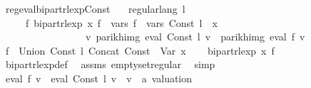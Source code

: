 \begin{isabellebody}
\ reg{\isacharunderscore}{\kern0pt}eval{\isacharunderscore}{\kern0pt}bipart{\isacharunderscore}{\kern0pt}rlexp{\isacharunderscore}{\kern0pt}Const{\isacharcolon}{\kern0pt}\isanewline
\ \ \ {\isachardoublequoteopen}regular{\isacharunderscore}{\kern0pt}lang\ l{\isachardoublequoteclose}\isanewline
\ \ \ \ \ {\isachardoublequoteopen}{\isasymexists}f{\isacharprime}{\kern0pt}{\isachardot}{\kern0pt}\ bipart{\isacharunderscore}{\kern0pt}rlexp\ x\ f{\isacharprime}{\kern0pt}\ {\isasymand}\ vars\ f{\isacharprime}{\kern0pt}\ {\isacharequal}{\kern0pt}\ vars\ {\isacharparenleft}{\kern0pt}Const\ l{\isacharparenright}{\kern0pt}\ {\isasymunion}\ {\isacharbraceleft}{\kern0pt}x{\isacharbraceright}{\kern0pt}\isanewline
\ \ \ \ \ \ \ \ \ \ \ \ \ \ \ \ {\isasymand}\ {\isacharparenleft}{\kern0pt}{\isasymforall}v{\isachardot}{\kern0pt}\ parikh{\isacharunderscore}{\kern0pt}img\ {\isacharparenleft}{\kern0pt}eval\ {\isacharparenleft}{\kern0pt}Const\ l{\isacharparenright}{\kern0pt}\ v{\isacharparenright}{\kern0pt}\ {\isacharequal}{\kern0pt}\ parikh{\isacharunderscore}{\kern0pt}img\ {\isacharparenleft}{\kern0pt}eval\ f{\isacharprime}{\kern0pt}\ v{\isacharparenright}{\kern0pt}{\isacharparenright}{\kern0pt}{\isachardoublequoteclose}\isanewline
%
\isadelimproof
%
\endisadelimproof
%
\isatagproof
{}\isamarkupfalse%
\ {\isacharminus}{\kern0pt}\isanewline
\ \ \isamarkupfalse%
\ {\isacharquery}{\kern0pt}f{\isacharprime}{\kern0pt}\ {\isacharequal}{\kern0pt}\ {\isachardoublequoteopen}Union\ {\isacharparenleft}{\kern0pt}Const\ l{\isacharparenright}{\kern0pt}\ {\isacharparenleft}{\kern0pt}Concat\ {\isacharparenleft}{\kern0pt}Const\ {\isacharbraceleft}{\kern0pt}{\isacharbraceright}{\kern0pt}{\isacharparenright}{\kern0pt}\ {\isacharparenleft}{\kern0pt}Var\ x{\isacharparenright}{\kern0pt}{\isacharparenright}{\kern0pt}{\isachardoublequoteclose}\isanewline
\ \ \isamarkupfalse%
\ {\isachardoublequoteopen}bipart{\isacharunderscore}{\kern0pt}rlexp\ x\ {\isacharquery}{\kern0pt}f{\isacharprime}{\kern0pt}{\isachardoublequoteclose}\isanewline
\ \ \ \ \isamarkupfalse%
\ bipart{\isacharunderscore}{\kern0pt}rlexp{\isacharunderscore}{\kern0pt}def\ \isamarkupfalse%
\ assms\ emptyset{\isacharunderscore}{\kern0pt}regular\ \isamarkupfalse%
\ simp\isanewline
\ \ \isamarkupfalse%
\ \isamarkupfalse%
\ {\isachardoublequoteopen}eval\ {\isacharquery}{\kern0pt}f{\isacharprime}{\kern0pt}\ v\ {\isacharequal}{\kern0pt}\ eval\ {\isacharparenleft}{\kern0pt}Const\ l{\isacharparenright}{\kern0pt}\ v{\isachardoublequoteclose}\ \ v\ {\isacharcolon}{\kern0pt}{\isacharcolon}{\kern0pt}\ {\isachardoublequoteopen}{\isacharprime}{\kern0pt}a\ valuation{\isachardoublequoteclose}\ \isamarkupfalse%

\end{isabellebody}
